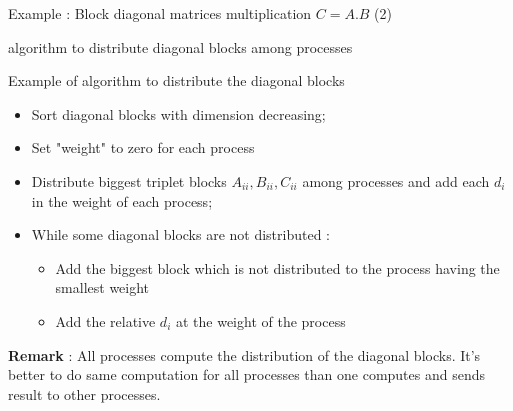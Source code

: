 \documentclass[compress,10pt,aspectratio=169]{beamer}
\begin{document}
\begin{frame}[fragile]{Example : Block diagonal matrices multiplication $C = A.B$ (2)}
    \scriptsize
    \begin{center}\small algorithm to distribute diagonal blocks among processes\end{center}

    \begin{block}{Example of algorithm to distribute the diagonal blocks}
    \begin{itemize}
        \item Sort diagonal blocks with dimension decreasing;
        \item Set "weight" to zero for each process
        \item Distribute biggest triplet blocks $A_{ii},B_{ii},C_{ii}$ among processes and add each $d_{i}$ in the weight of each process;
        \item While some diagonal blocks are not distributed :
        \begin{itemize}
            \item {\scriptsize Add the biggest block which is not distributed to the process having the smallest weight }
            \item {\scriptsize Add the relative $d_{i}$ at the weight of the process}
        \end{itemize}
    \end{itemize}
    \end{block}

    \textbf{Remark} : All processes compute the distribution of the diagonal blocks. It's better to do same computation for all processes
                      than one computes and sends result to other processes.

\end{frame}
\end{document}
